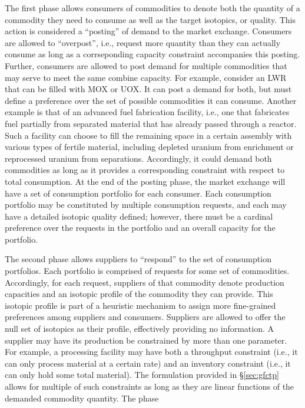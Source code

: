 The first phase allows consumers of commodities to denote both the quantity of a
commodity they need to consume as well as the target isotopics, or quality. This
action is considered a ``posting'' of demand to the market exchange. Consumers
are allowed to ``overpost'', i.e., request more quantity than they can actually
consume as long as a corrseponding capacity constraint accompanies this
posting. Further, consumers are allowed to post demand for multiple commodities
that may serve to meet the same combine capacity. For example, consider an LWR
that can be filled with MOX or UOX. It can post a demand for both, but must
define a preference over the set of possible commodities it can consume. Another
example is that of an advanced fuel fabrication facility, i.e., one that
fabricates fuel partially from separated material that has already passed
through a reactor. Such a facility can choose to fill the remaining space in a
certain assembly with various types of fertile material, including depleted
uranium from enrichment or reprocessed uranium from separations. Accordingly, it
could demand both commodities as long as it provides a corresponding constraint
with respect to total consumption. At the end of the posting phase, the market
exchange will have a set of consumption portfolio for each consumer. Each
consumption portfolio may be constituted by multiple consumption requests, and
each may have a detailed isotopic quality defined; however, there must be a
cardinal preference over the requests in the portfolio and an overall capacity
for the portfolio. 

The second phase allows suppliers to ``respond'' to the set of consumption
portfolios. Each portfolio is comprised of requests for some set of
commodities. Accordingly, for each request, suppliers of that commodity denote
production capacities and an isotopic profile of the commodity they can
provide. This isotopic profile is part of a heuristic mechanism to assign more
fine-grained preferences among suppliers and consumers. Suppliers are allowed to
offer the null set of isotopics as their profile, effectively providing no
information. A supplier may have its production be constrained by more than one
parameter. For example, a processing facility may have both a throughput
constraint (i.e., it can only process material at a certain rate) and an
inventory constraint (i.e., it can only hold some total material). The
formulation provided in \S\ref{sec:gfctp} allows for multiple of such
constraints as long as they are linear functions of the demanded commodity
quantity. The phase

